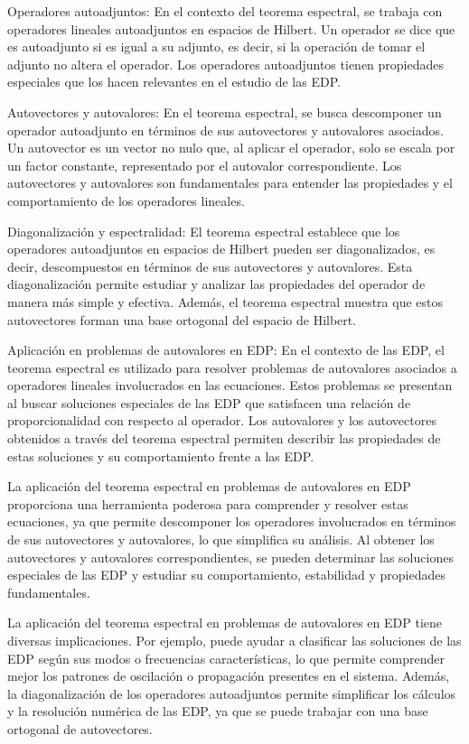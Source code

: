 \documentclass{article}
\begin{document}
    Operadores autoadjuntos: En el contexto del teorema espectral, se trabaja con operadores lineales autoadjuntos en espacios de Hilbert. Un operador se dice que es autoadjunto si es igual a su adjunto, es decir, si la operación de tomar el adjunto no altera el operador. Los operadores autoadjuntos tienen propiedades especiales que los hacen relevantes en el estudio de las EDP.

    Autovectores y autovalores: En el teorema espectral, se busca descomponer un operador autoadjunto en términos de sus autovectores y autovalores asociados. Un autovector es un vector no nulo que, al aplicar el operador, solo se escala por un factor constante, representado por el autovalor correspondiente. Los autovectores y autovalores son fundamentales para entender las propiedades y el comportamiento de los operadores lineales.

    Diagonalización y espectralidad: El teorema espectral establece que los operadores autoadjuntos en espacios de Hilbert pueden ser diagonalizados, es decir, descompuestos en términos de sus autovectores y autovalores. Esta diagonalización permite estudiar y analizar las propiedades del operador de manera más simple y efectiva. Además, el teorema espectral muestra que estos autovectores forman una base ortogonal del espacio de Hilbert.

    Aplicación en problemas de autovalores en EDP: En el contexto de las EDP, el teorema espectral es utilizado para resolver problemas de autovalores asociados a operadores lineales involucrados en las ecuaciones. Estos problemas se presentan al buscar soluciones especiales de las EDP que satisfacen una relación de proporcionalidad con respecto al operador. Los autovalores y los autovectores obtenidos a través del teorema espectral permiten describir las propiedades de estas soluciones y su comportamiento frente a las EDP.

    La aplicación del teorema espectral en problemas de autovalores en EDP proporciona una herramienta poderosa para comprender y resolver estas ecuaciones, ya que permite descomponer los operadores involucrados en términos de sus autovectores y autovalores, lo que simplifica su análisis. Al obtener los autovectores y autovalores correspondientes, se pueden determinar las soluciones especiales de las EDP y estudiar su comportamiento, estabilidad y propiedades fundamentales.

    La aplicación del teorema espectral en problemas de autovalores en EDP tiene diversas implicaciones. Por ejemplo, puede ayudar a clasificar las soluciones de las EDP según sus modos o frecuencias características, lo que permite comprender mejor los patrones de oscilación o propagación presentes en el sistema. Además, la diagonalización de los operadores autoadjuntos permite simplificar los cálculos y la resolución numérica de las EDP, ya que se puede trabajar con una base ortogonal de autovectores.
\end{document}
